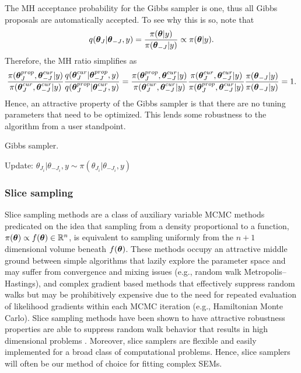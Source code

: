 The MH acceptance probability for the Gibbs sampler is one, thus all Gibbs proposals are automatically accepted. To see why this is so, note that $$q(\boldsymbol{\theta}_{J}|\boldsymbol{\theta}_{-J},y) = \frac{\pi(\boldsymbol{\theta}|y)}{\pi(\boldsymbol{\theta}_{-J}|y)} \propto\pi(\boldsymbol{\theta}|y).$$
Therefore, the MH ratio simplifies as
\begin{align*}
\frac{\pi(\boldsymbol{\theta}_J^{prop},\boldsymbol{\theta}_{-J}^{cur}|y)}{\pi(\boldsymbol{\theta}_J^{cur},\boldsymbol{\theta}_{-J}^{cur}|y)}\frac{q(\boldsymbol{\theta}_J^{cur}|\boldsymbol{\theta}_{-J}^{prop},y)}{q(\boldsymbol{\theta}_J^{prop}|\boldsymbol{\theta}_{-J}^{cur},y)} &= \frac{\pi(\boldsymbol{\theta}_J^{prop},\boldsymbol{\theta}_{-J}^{cur}|y)}{\pi(\boldsymbol{\theta}_J^{cur},\boldsymbol{\theta}_{-J}^{cur}|y)}\frac{\pi(\boldsymbol{\theta}_J^{cur},\boldsymbol{\theta}_{-J}^{cur}|y)}{\pi(\boldsymbol{\theta}_J^{prop},\boldsymbol{\theta}_{-J}^{cur}|y)}\frac{\pi(\boldsymbol{\theta}_{-J}|y)}{\pi(\boldsymbol{\theta}_{-J}|y)} = 1. \\
\end{align*}
Hence, an attractive property of the Gibbs sampler is that there are no tuning parameters that need to be optimized. This lends some robustness to the algorithm from a user standpoint.  

\begin{algorithm}[htbp]
	\caption{Gibbs sampler.}
	\label{alg:gibbs}
	\begin{algorithmic}[1]
			\State Update: $ \theta_{J_i}|\theta_{-J_i},y\sim\pi(\theta_{J_i}|\theta_{-J_i},y) $
		\EndFor
		\EndProcedure
	\end{algorithmic}
\end{algorithm}

\subsubsection{Slice sampling}
\label{subsubsec:slice_sampling}

Slice sampling methods are a class of auxiliary variable MCMC methods predicated on the idea that sampling from a density proportional to a function, $ \pi(\boldsymbol{\theta})\propto f(\boldsymbol{\theta}) \in \mathbb{R}^n $, is equivalent to sampling uniformly from the $ n+1 $ dimensional volume beneath $ f(\boldsymbol{\theta}) $. These methods occupy an attractive middle ground between simple algorithms that lazily explore the parameter space and may suffer from convergence and mixing issues (e.g., random walk Metropolis--Hastings), and complex gradient based methods that effectively suppress random walks but may be prohibitively expensive due to the need for repeated evaluation of likelihood gradients within each MCMC iteration (e.g., Hamiltonian Monte Carlo). Slice sampling methods have been shown to have attractive robustness properties are able to suppress random walk behavior that results in high dimensional problems \cite{mira2002efficiency,roberts1999convergence,neal2003slice}. Moreover, slice samplers are flexible and easily implemented for a broad class of computational problems. Hence, slice samplers will often be our method of choice for fitting complex SEMs. 

